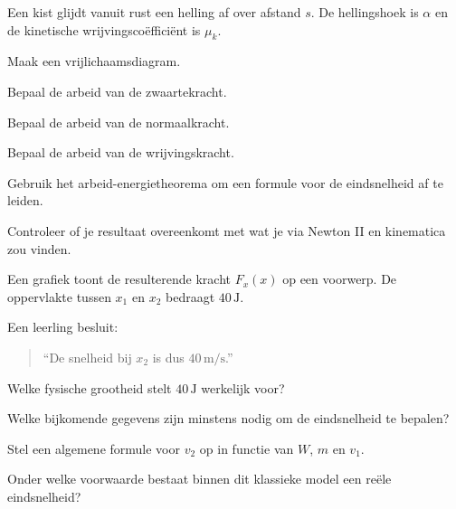 \documentclass{ximera}
\begin{document}
\begin{oefening}{\oefU\ESS}

Een kist glijdt vanuit rust een helling af over afstand $s$. De hellingshoek
is $\alpha$ en de kinetische wrijvingscoëfficiënt is $\mu_k$.

\begin{question}
Maak een vrijlichaamsdiagram.
\end{question}

\begin{question}
Bepaal de arbeid van de zwaartekracht.
\end{question}

\begin{question}
Bepaal de arbeid van de normaalkracht.
\end{question}

\begin{question}
Bepaal de arbeid van de wrijvingskracht.
\end{question}

\begin{question}
Gebruik het arbeid-energietheorema om een formule voor de eindsnelheid af te
leiden.
\end{question}

\begin{question}
Controleer of je resultaat overeenkomt met wat je via Newton II en kinematica
zou vinden.
\end{question}

\end{oefening}


\begin{oefening}{\oefG}

Een grafiek toont de resulterende kracht $F_x(x)$ op een voorwerp. De
oppervlakte tussen $x_1$ en $x_2$ bedraagt $40\,\mathrm J$.

Een leerling besluit:

\begin{quote}
``De snelheid bij $x_2$ is dus $40\,\mathrm{m/s}$.''
\end{quote}

\begin{question}
Welke fysische grootheid stelt $40\,\mathrm J$ werkelijk voor?
\end{question}

\begin{question}
Welke bijkomende gegevens zijn minstens nodig om de eindsnelheid te bepalen?
\end{question}

\begin{question}
Stel een algemene formule voor $v_2$ op in functie van $W$, $m$ en $v_1$.
\end{question}

\begin{question}
Onder welke voorwaarde bestaat binnen dit klassieke model een reële
eindsnelheid?
\end{question}

\end{oefening}
\end{document}
